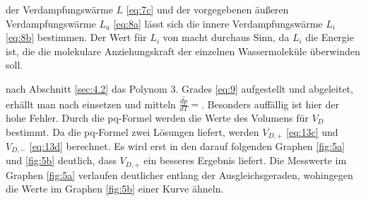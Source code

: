 \justifying der Verdampfungswärme $L$ \eqref{eq:7c} und der vorgegebenen äußeren Verdampfungswärme $L_a$ \eqref{eq:8a} lässt
sich die innere Verdampfungswärme $L_i$ \eqref{eq:8b} bestimmen. Der Wert für $L_i$ von  macht durchaus Sinn, da $L_i$ die Energie ist,
die die molekulare Anziehungskraft der einzelnen Wassermoleküle überwinden soll. 

\justifying nach Abschnitt \ref{sec:4.2} das Polynom 3. Grades \eqref{eq:9} aufgestellt und abgeleitet, erhällt man nach einsetzen und mitteln    
$\overline{\frac{dp}{dT}} = \text{}$\!. Besonders auffällig ist hier der hohe Fehler. 
Durch die pq-Formel werden die Werte des Volumens für $V_D$ bestimmt. Da die pq-Formel zwei Lösungen liefert, werden $V_{D,+}$ \eqref{eq:13c}
und $V_{D,-}$ \eqref{eq:13d} berechnet. Es wird erst in den darauf folgenden Graphen \ref{fig:5a} und \ref{fig:5b} deutlich, dass $V_{D,+}$ ein 
besseres Ergebnis liefert. Die Messwerte im Graphen \ref{fig:5a} verlaufen deutlicher entlang der Ausgleichsgeraden, wohingegen die Werte im Graphen
\ref{fig:5b} einer Kurve ähneln. 



\newpage
\printbibliography


